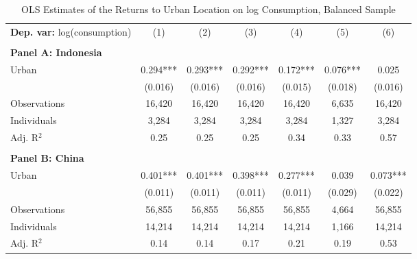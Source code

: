 \begin{table}[htbp] \centering \begin{threeparttable}
 \caption{OLS Estimates of the Returns to Urban Location on log Consumption, Balanced Sample} 
 \label{tab:OLS_cons_urb_bal} 
\begin{tabular}{l cccccc} \toprule  \textbf{Dep. var:}  log(consumption) 
                    &\multicolumn{1}{c}{(1)}   &\multicolumn{1}{c}{(2)}   &\multicolumn{1}{c}{(3)}   &\multicolumn{1}{c}{(4)}   &\multicolumn{1}{c}{(5)}   &\multicolumn{1}{c}{(6)}   \\
                    &               &               &               &               &               &               \\
\textbf{Panel A: Indonesia} \\
Urban               &       0.294***&       0.293***&       0.292***&       0.172***&       0.076***&       0.025   \\
                    &     (0.016)   &     (0.016)   &     (0.016)   &     (0.015)   &     (0.018)   &     (0.016)   \\
\addlinespace
Observations        &      16,420   &      16,420   &      16,420   &      16,420   &       6,635   &      16,420   \\
Individuals         &       3,284   &       3,284   &       3,284   &       3,284   &       1,327   &       3,284   \\
Adj. R$^{2}$        &        0.25   &        0.25   &        0.25   &        0.34   &        0.33   &        0.57   \\
\cmidrule{2 -7}
                    &               &               &               &               &               &               \\
\textbf{Panel B: China} \\
Urban               &       0.401***&       0.401***&       0.398***&       0.277***&       0.039   &       0.073***\\
                    &     (0.011)   &     (0.011)   &     (0.011)   &     (0.011)   &     (0.029)   &     (0.022)   \\
\addlinespace
Observations        &      56,855   &      56,855   &      56,855   &      56,855   &       4,664   &      56,855   \\
Individuals         &      14,214   &      14,214   &      14,214   &      14,214   &       1,166   &      14,214   \\
Adj. R$^{2}$        &        0.14   &        0.14   &        0.17   &        0.21   &        0.19   &        0.53   \\

\end{tabular}
\end{threeparttable}
\end{table}

